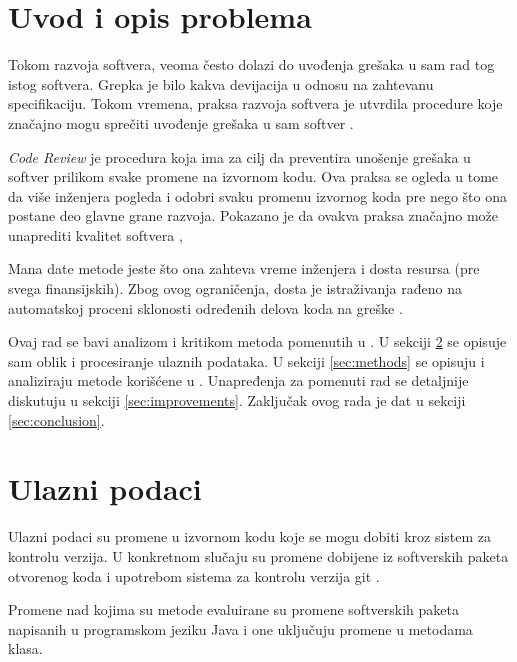 \documentclass[twocolumns]{article}
\begin{document}
\begin{multicols}{2}

  \section{Uvod i opis problema}
  \label{sec:introduction}
  
  Tokom razvoja softvera, veoma često dolazi do uvođenja grešaka u sam rad tog istog softvera. Grepka je bilo kakva devijacija u odnosu na zahtevanu specifikaciju. Tokom vremena, praksa razvoja softvera je utvrdila procedure koje značajno mogu sprečiti uvođenje grešaka u sam softver \cite{kozlov2013fault}. 
  
  \textit{Code Review} je procedura koja ima za cilj da preventira unošenje grešaka u softver prilikom svake promene na izvornom kodu. Ova praksa se ogleda u tome da više inženjera pogleda i odobri svaku promenu izvornog koda pre nego što ona postane deo glavne grane razvoja. Pokazano je da ovakva praksa značajno može unaprediti kvalitet softvera \cite{kozlov2013fault},
  
  Mana date metode jeste što ona zahteva vreme inženjera i dosta resursa (pre svega finansijskih). Zbog ovog ograničenja, dosta je istraživanja rađeno na automatskoj proceni sklonosti određenih delova koda na greške \cite{altiero2023ai,fenton1999critique,gondra2008applying,ouellet2023combining}. 
  
  Ovaj rad se bavi analizom i kritikom metoda pomenutih u \cite{altiero2023ai}. U sekciji \ref{sec:input_data} se opisuje sam oblik i procesiranje ulaznih podataka. U sekciji \ref{sec:methods} se opisuju i analiziraju metode korišćene u \cite{altiero2023ai}. Unapređenja za pomenuti rad se detaljnije diskutuju u sekciji \ref{sec:improvements}. Zaključak ovog rada je dat u sekciji \ref{sec:conclusion}.
  
  
  
  \section{Ulazni podaci}
  \label{sec:input_data}
  
  Ulazni podaci su promene u izvornom kodu koje se mogu dobiti kroz sistem za kontrolu verzija. U konkretnom slučaju su promene dobijene iz softverskih paketa otvorenog koda i upotrebom sistema za kontrolu verzija git \cite{spinellis2012git}. 
  
  Promene nad kojima su metode evaluirane su promene softverskih paketa napisanih u programskom jeziku Java i one uključuju promene u metodama klasa. 
  

\end{multicols}
\end{document}
